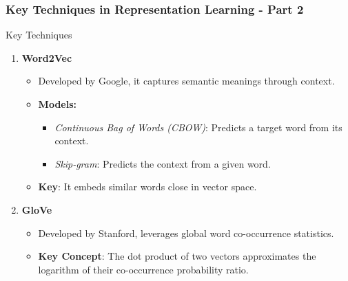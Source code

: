 \documentclass[aspectratio=169]{beamer}
\begin{document}
\begin{frame}[fragile]
    \frametitle{Key Techniques in Representation Learning - Part 2}
    \begin{block}{Key Techniques}
        \begin{enumerate}
            \item \textbf{Word2Vec}
                \begin{itemize}
                    \item Developed by Google, it captures semantic meanings through context.
                    \item \textbf{Models:}
                        \begin{itemize}
                            \item \textit{Continuous Bag of Words (CBOW)}: Predicts a target word from its context.
                            \item \textit{Skip-gram}: Predicts the context from a given word.
                        \end{itemize}
                    \item \textbf{Key}: It embeds similar words close in vector space.
                \end{itemize}
            \item \textbf{GloVe}
                \begin{itemize}
                    \item Developed by Stanford, leverages global word co-occurrence statistics.
                    \item \textbf{Key Concept}: The dot product of two vectors approximates the logarithm of their co-occurrence probability ratio.
                \end{itemize}
        \end{enumerate}
    \end{block}
\end{frame}
\end{document}
